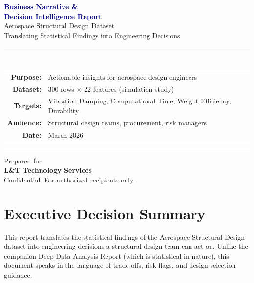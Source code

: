 \documentclass[11pt, a4paper]{report}
\begin{document}
\begin{titlepage}
\begin{center}
\vspace*{2cm}
{\Huge\bfseries\textcolor{navy}{Business Narrative \&}}\\[0.4cm]
{\Huge\bfseries\textcolor{navy}{Decision Intelligence Report}}\\[0.9cm]
{\Large\textcolor{slate}{Aerospace Structural Design Dataset}}\\[0.3cm]
{\large\textcolor{slate}{Translating Statistical Findings into Engineering Decisions}}
\vspace{1.5cm}

\rule{0.65\textwidth}{1.5pt}\\[0.5cm]
{\large
\begin{tabular}{rl}
\textbf{Purpose:}   & Actionable insights for aerospace design engineers \\[4pt]
\textbf{Dataset:}   & 300 rows $\times$ 22 features (simulation study) \\[4pt]
\textbf{Targets:}   & Vibration Damping, Computational Time, Weight Efficiency, Durability \\[4pt]
\textbf{Audience:}  & Structural design teams, procurement, risk managers \\[4pt]
\textbf{Date:}      & March 2026 \\
\end{tabular}}
\vspace{1.5cm}
\rule{0.65\textwidth}{1.5pt}

\vspace{2cm}
{\large Prepared for}\\[0.3cm]
{\Large\bfseries L\&T Technology Services}\\[1cm]
{\footnotesize\textcolor{slate}{Confidential. For authorised recipients only.}}
\end{center}
\end{titlepage}

\tableofcontents
\newpage

\chapter{Executive Decision Summary}

This report translates the statistical findings of the Aerospace Structural Design dataset into engineering decisions a structural design team can act on. Unlike the companion Deep Data Analysis Report (which is statistical in nature), this document speaks in the language of trade-offs, risk flags, and design selection guidance.
\end{document}
